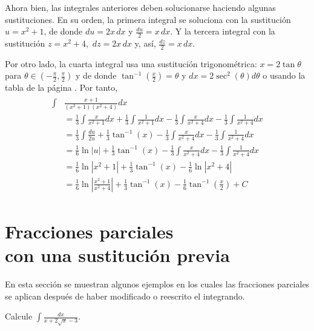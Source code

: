 Ahora bien, las integrales anteriores deben solucionarse haciendo algunas sustituciones. En su orden, la primera integral se soluciona con la sustitución $u=x^{2}+1$, de donde $du=2x\,dx$ y $\frac{du}{2}=x\,dx$. Y la tercera integral con la sustitución $z=x^{2}+4,$ $dz=2x\,dx$ y, así, $\frac{dz}{2}=x\,dx$.

Por otro lado, la cuarta integral usa una sustitución trigonométrica: $x=2\tan \theta $ para $\theta \in \left( -\frac{\pi }{2},\frac{\pi }{2}\right)$ y de donde $\tan ^{-1}\left( \frac{x}{2}\right) =\theta $ y
$dx=2\sec ^{2}\left( \theta \right) d\theta $ o usando la tabla de la página \pageref{TablaIntegrales}.
Por tanto,
\begin{gather*}
  \begin{aligned}
    \int &\frac{x+1}{(x^{2}+1)(x^{2}+4)}dx\\
    &=\frac{1}{3}\int \frac{x}{x^{2}+1}dx+\frac{1}{3}\int \frac{1}{x^{2}+1}dx-\frac{1}{3}\int \frac{x}{x^{2}+4}dx-\frac{1}{3}\int \frac{1}{x^{2}+4}dx\\
    &=\frac{1}{3}\int \frac{du}{2u}+\frac{1}{3}\tan ^{-1}\left( x\right)-\frac{1}{3}\int \frac{x}{x^{2}+4}dx-\frac{1}{3}\int \frac{1}{x^{2}+4}dx\\
    &=\frac{1}{6}\ln \left\vert u\right\vert +\frac{1}{3}\tan ^{-1}\left(
    x\right) -\frac{1}{3}\int \frac{x}{x^{2}+4}dx-\frac{1}{3}\int \frac{1}{x^{2}+4}dx\\
    &=\frac{1}{6}\ln \left\vert x^{2}+1\right\vert +\frac{1}{3}\tan ^{-1}\left(
    x\right) -\frac{1}{6}\ln \left\vert x^{2}+4\right\vert\\
    &=\frac{1}{6}\ln \left\vert \frac{x^{2}+1}{x^{2}+4}\right\vert +\frac{1}{3}%
    \tan ^{-1}\left( x\right) -\frac{1}{6}\tan ^{-1}\left( \frac{x}{2}\right) +C
  \end{aligned}
\end{gather*}

\section[Fracciones parciales con una sustitución previa]{Fracciones parciales\\ con una sustitución previa}

En esta sección se muestran algunos ejemplos en los cuales las fracciones parciales se aplican después de haber modificado o reescrito el integrando.

\begin{ejemplo}
  Calcule $\int \frac{dx}{x+2\sqrt{x}-3}$.
\end{ejemplo}

